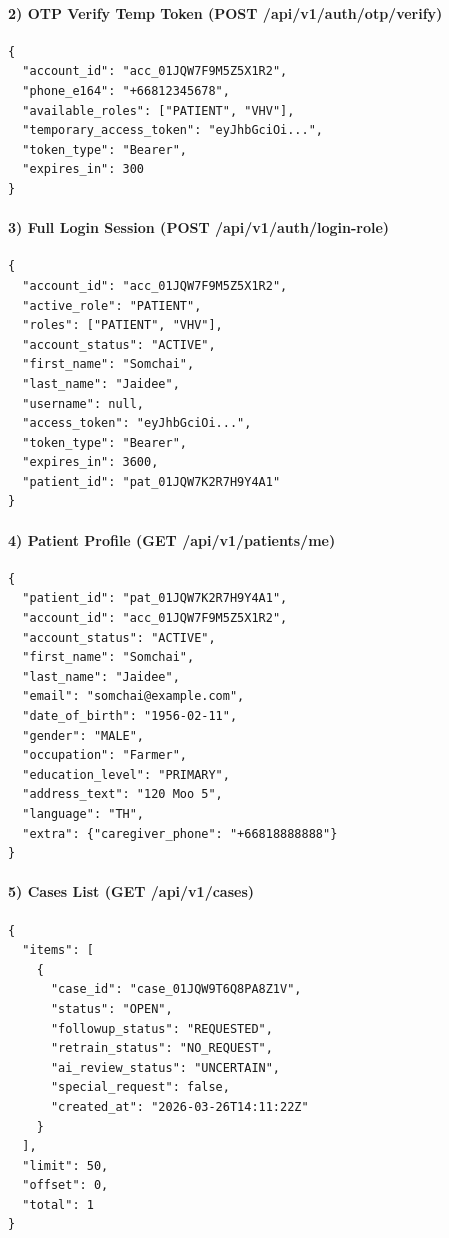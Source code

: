 \paragraph*{2) OTP Verify Temp Token (POST /api/v1/auth/otp/verify)}
\begin{verbatim}
{
  "account_id": "acc_01JQW7F9M5Z5X1R2",
  "phone_e164": "+66812345678",
  "available_roles": ["PATIENT", "VHV"],
  "temporary_access_token": "eyJhbGciOi...",
  "token_type": "Bearer",
  "expires_in": 300
}
\end{verbatim}

\paragraph*{3) Full Login Session (POST /api/v1/auth/login-role)}
\begin{verbatim}
{
  "account_id": "acc_01JQW7F9M5Z5X1R2",
  "active_role": "PATIENT",
  "roles": ["PATIENT", "VHV"],
  "account_status": "ACTIVE",
  "first_name": "Somchai",
  "last_name": "Jaidee",
  "username": null,
  "access_token": "eyJhbGciOi...",
  "token_type": "Bearer",
  "expires_in": 3600,
  "patient_id": "pat_01JQW7K2R7H9Y4A1"
}
\end{verbatim}

\paragraph*{4) Patient Profile (GET /api/v1/patients/me)}
\begin{verbatim}
{
  "patient_id": "pat_01JQW7K2R7H9Y4A1",
  "account_id": "acc_01JQW7F9M5Z5X1R2",
  "account_status": "ACTIVE",
  "first_name": "Somchai",
  "last_name": "Jaidee",
  "email": "somchai@example.com",
  "date_of_birth": "1956-02-11",
  "gender": "MALE",
  "occupation": "Farmer",
  "education_level": "PRIMARY",
  "address_text": "120 Moo 5",
  "language": "TH",
  "extra": {"caregiver_phone": "+66818888888"}
}
\end{verbatim}

\paragraph*{5) Cases List (GET /api/v1/cases)}
\begin{verbatim}
{
  "items": [
    {
      "case_id": "case_01JQW9T6Q8PA8Z1V",
      "status": "OPEN",
      "followup_status": "REQUESTED",
      "retrain_status": "NO_REQUEST",
      "ai_review_status": "UNCERTAIN",
      "special_request": false,
      "created_at": "2026-03-26T14:11:22Z"
    }
  ],
  "limit": 50,
  "offset": 0,
  "total": 1
}
\end{verbatim}

